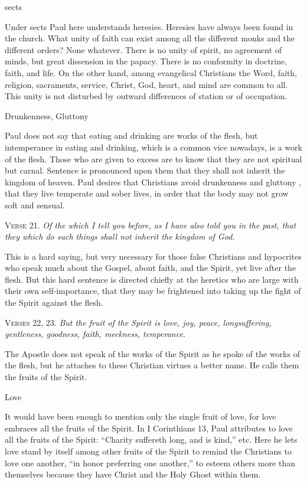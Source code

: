 sects

Under sects Paul here understands heresies. Heresies have always been found in the church. What unity of faith can exist among all the different monks and the different orders? None whatever. There is no unity of spirit, no agreement of minds, but great dissension in the papacy. There is no conformity in doctrine, faith, and life. On the other hand, among evangelical Christians the Word, faith, religion, sacraments, service, Christ, God, heart, and mind are common to all. This unity is not disturbed by outward differences of station or of occupation.

Drunkenness, Gluttony

Paul does not say that eating and drinking are works of the flesh, but intemperance in eating and drinking, which is a common vice nowadays, is a work of the flesh. Those who are given to excess are to know that they are not spiritual but carnal. Sentence is pronounced upon them that they shall not inherit the kingdom of heaven. Paul desires that Christians avoid drunkenness and gluttony , that they live temperate and sober lives, in order that the body may not grow soft and sensual.

\textsc{Verse} 21. \emph{Of the which I tell you before, as I have also told you in the past, that they which do such things shall not inherit the kingdom of God.}

This is a hard saying, but very necessary for those false Christians and hypocrites who speak much about the Gospel, about faith, and the Spirit, yet live after the flesh. But this hard sentence is directed chiefly at the heretics who are large with their own self-importance, that they may be frightened into taking up the fight of the Spirit against the flesh.

\textsc{Verses} 22, 23. \emph{But the fruit of the Spirit is love, joy, peace, longsuffering, gentleness, goodness, faith, meekness, temperance.}

The Apostle does not speak of the works of the Spirit as he spoke of the works of the flesh, but he attaches to these Christian virtues a better name. He calls them the fruits of the Spirit.

Love

It would have been enough to mention only the single fruit of love, for love embraces all the fruits of the Spirit. In I Corinthians 13, Paul attributes to love all the fruits of the Spirit: “Charity suffereth long, and is kind,” etc. Here he lets love stand by itself among other fruits of the Spirit to remind the Christians to love one another, “in honor preferring one another,” to esteem others more than themselves because they have Christ and the Holy Ghost within them.

